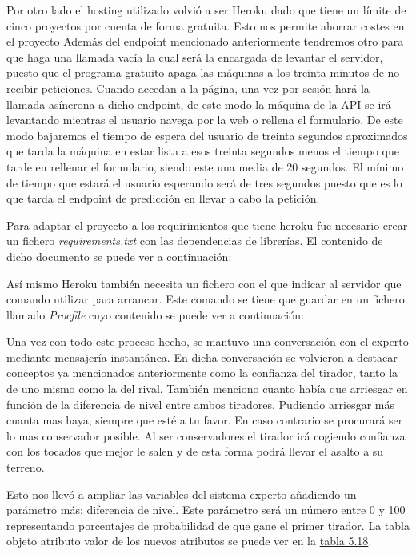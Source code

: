 Por otro lado el hosting utilizado volvió a ser Heroku dado que tiene un límite de cinco
proyectos por cuenta de forma gratuita. Esto nos permite ahorrar costes en el proyecto
Además del endpoint mencionado anteriormente tendremos otro para que haga una llamada vacía
la cual será la encargada de levantar el servidor, puesto que el programa gratuito apaga
las máquinas a los treinta minutos de no recibir peticiones. Cuando accedan a la página, una
vez por sesión hará la llamada asíncrona a dicho endpoint, de este modo la máquina de la API
se irá levantando mientras el usuario navega por la web o rellena el formulario. De este modo
bajaremos el tiempo de espera del usuario de treinta segundos aproximados que tarda la máquina en
estar lista a esos treinta segundos menos el tiempo que tarde en rellenar el formulario, siendo
este una media de 20 segundos. El mínimo de tiempo que estará el usuario esperando será de tres
segundos puesto que es lo que tarda el endpoint de predicción en llevar a cabo la petición.

Para adaptar el proyecto a los requirimientos que tiene heroku fue necesario crear un fichero
\textit{requirements.txt} con las dependencias de librerías. El contenido de dicho documento
se puede ver a continuación:



Así mismo Heroku también necesita un fichero con el que indicar al servidor que comando
utilizar para arrancar. Este comando se tiene que guardar en un fichero llamado
\textit{Procfile} cuyo contenido se puede ver a continuación:




Una vez con todo este proceso hecho, se mantuvo una conversación con el experto mediante mensajería
instantánea. En dicha conversación se volvieron a destacar conceptos ya mencionados anteriormente
como la confianza del tirador, tanto la de uno mismo como la del rival. También menciono cuanto
había que arriesgar en función de la diferencia de nivel entre ambos tiradores. Pudiendo
arriesgar más cuanta mas haya, siempre que esté a tu favor. En caso contrario se procurará ser
lo mas conservador posible. Al ser conservadores el tirador irá cogiendo confianza con los
tocados que mejor le salen y de esta forma podrá llevar el asalto a su terreno.

Esto nos llevó a ampliar las variables del sistema experto añadiendo un parámetro más: diferencia
de nivel. Este parámetro será un número entre 0 y 100 representando porcentajes de probabilidad
de que gane el primer tirador. La tabla objeto atributo valor de los nuevos atributos se puede
ver en la \hyperref[tab:Tabla objeto atributo y valor victoria]{tabla 5.18}.

